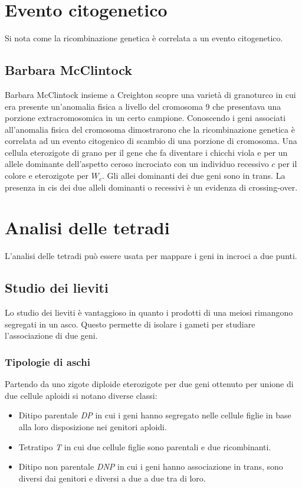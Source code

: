 \section{Evento citogenetico}
Si nota come la ricombinazione genetica \`e correlata a un evento citogenetico.

	\subsection{Barbara McClintock}
	Barbara McClintock insieme a Creighton scopre una variet\`a di granoturco in cui era presente un'anomalia fisica a livello del cromosoma $9$ che presentava una porzione extracromosomica in un certo campione.
	Conoscendo i geni associati all'anomalia fisica del cromosoma dimostrarono che la ricombinazione genetica \`e correlata ad un evento citogenico di scambio di una porzione di cromosoma.
	Una cellula eterozigote di grano per il gene che fa diventare i chicchi viola e per un allele dominante dell'aspetto ceroso incrociato con un individuo recessivo $c$ per il colore e eterozigote per $W_c$.
	Gli allei dominanti dei due geni sono in trans.
	La presenza in cis dei due alleli dominanti o recessivi \`e un evidenza di crossing-over.

\section{Analisi delle tetradi}
L'analisi delle tetradi pu\`o essere usata per mappare i geni in incroci a due punti.

	\subsection{Studio dei lieviti}
	Lo studio dei lieviti \`e vantaggioso in quanto i prodotti di una meiosi rimangono segregati in un asco.
	Questo permette di isolare i gameti per studiare l'associazione di due geni.

		\subsubsection{Tipologie di aschi}
		Partendo da uno zigote diploide eterozigote per due geni ottenuto per unione di due cellule aploidi si notano diverse classi:
		\begin{multicols}{2}
			\begin{itemize}
				\item Ditipo parentale \emph{DP} in cui i geni hanno segregato nelle cellule figlie in base alla loro disposizione nei genitori aploidi.
				\item Tetratipo \emph{T} in cui due cellule figlie sono parentali e due ricombinanti.
				\item Ditipo non parentale \emph{DNP} in cui i geni hanno associazione in trans, sono diversi dai genitori e diversi a due a due tra di loro.
			\end{itemize}
		\end{multicols}

